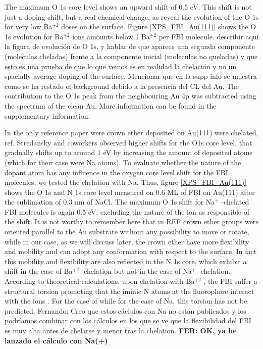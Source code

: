 \documentclass[aps,prl,reprint,longbibliography,superscriptaddress]{revtex4-1}
\def\Ba{Ba$^{+2}$ }
\def\Na{Na$^{+}$ }
\newcommand{\completar}[1]{{\color{red} #1}}
\begin{document}
The maximum O 1s core level shows an upward shift of 0.5 eV. This shift is not just a doping shift, but a real chemical change, as reveal the evolution of the O 1s for very low \Ba doses on the surface. Figure \ref{XPS_FBI_Au(111)} shows the O 1s evolution for \Ba ions amounts below 1 \Ba per FBI molecule. \completar{describir aquí la figura de evolución de O 1s, y hablar de que aparece una segunda componente (moleculas cheladas) frente a la componente inicial (moleculas no queladas) y que esto es una prueba de que lo que vemos es en realidad la chelación y no un spacially average doping of the surface. Mencionar que en la supp info se muestra como se ha restado el background debido a la presencia del CL del Au}. The contribution to the O 1s peak from the neighbouring Au 4p was subtracted using the spectrum of the clean Au. More information can be found in the supplementary information.

In the only reference paper were crown ether deposited on Au(111) were chelated, ref. \cite{stredansky_-surface_2019} Stredansky and coworkers observed higher shifts for the O1s core level, that gradually shifts up to around 1 eV by increasing the amount of deposited atoms (which for their case were Na atoms). 
To evaluate whether the nature of the dopant atom has any influence in the oxygen core level shift for the FBI molecules, we tested the chelation with Na. Thus, figure \ref{XPS_FBI_Au(111)} shows the O 1s and N 1s core level measured on 0.6 ML of FBI on Au(111) after the sublimation of 0.3 nm of NaCl. The maximum O 1s shift for \Na-chelated FBI molecules is again 0.5 eV, excluding the nature of the ion as responsible of the shift.
It is not worthy to remember here that in REF \cite{stredansky_-surface_2019} crown ether groups were oriented parallel to the Au substrate without any possibility to move or rotate, while in our case, as we will discuss later, the crown ether have more flexibility and mobility and can adopt any conformation with respect to the surface. In fact this mobility and flexibility are also reflected in the N 1s core, which exhibit a shift in the case of \Ba-chelation but not in the case of \Na-chelation.
According to theoretical calculations, upon chelation with \Ba, the FBI suffer a structural torsion promoting that the iminic N atoms at the fluorophore interact with the ions \cite{rivilla_fluorescent_2020}. For the case of  while for the case of Na, this torsion has not be predicted. \completar{Fernando: Creo que estos cáclulos con Na no están publicados y los podríamos combinar con los cálculos en los que se ve que la flexibilidad del FBI es muy alta antes de chelarse y menor tras la chelation. \textbf{FER: OK, ya he lanzado el cálculo con Na(+)}}
\end{document}
